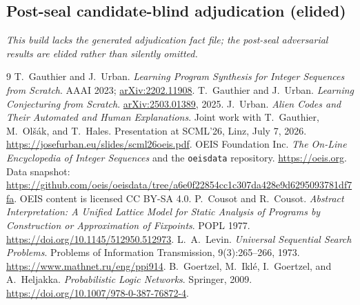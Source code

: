 \documentclass[11pt]{article}
\newcommand{\code}[1]{\texttt{#1}}
\begin{document}
\subsection{Post-seal candidate-blind adjudication (elided)}
\emph{This build lacks the generated adjudication fact file; the post-seal
adversarial results are elided rather than silently omitted.}
\fi

\begin{thebibliography}{9}
 T.~Gauthier and J.~Urban.
  \emph{Learning Program Synthesis for Integer Sequences from Scratch}.
  AAAI 2023; \href{https://arxiv.org/abs/2202.11908}{arXiv:2202.11908}.
 T.~Gauthier and J.~Urban.
  \emph{Learning Conjecturing from Scratch}.
  \href{https://arxiv.org/abs/2503.01389}{arXiv:2503.01389}, 2025.
 J.~Urban.
  \emph{Alien Codes and Their Automated and Human Explanations}.
  Joint work with T.~Gauthier, M.~Ol\v{s}\'ak, and T.~Hales. Presentation at SCML'26,
  Linz, July 7, 2026.
  \url{https://josefurban.eu/slides/scml26oeis.pdf}.
 OEIS Foundation Inc.
  \emph{The On-Line Encyclopedia of Integer Sequences} and the \code{oeisdata}
  repository. \url{https://oeis.org}. Data snapshot:
  \url{https://github.com/oeis/oeisdata/tree/a6e0f22854cc1c307da428e9d6295093781df7fa}.
  OEIS content is licensed CC BY-SA 4.0.
 P.~Cousot and R.~Cousot.
  \emph{Abstract Interpretation: A Unified Lattice Model for Static Analysis of Programs by
  Construction or Approximation of Fixpoints}. POPL 1977.
  \url{https://doi.org/10.1145/512950.512973}.
 L.~A.~Levin.
  \emph{Universal Sequential Search Problems}. Problems of Information Transmission,
  9(3):265--266, 1973. \url{https://www.mathnet.ru/eng/ppi914}.
 B.~Goertzel, M.~Ikl\'e, I.~Goertzel, and A.~Heljakka.
  \emph{Probabilistic Logic Networks}. Springer, 2009.
  \url{https://doi.org/10.1007/978-0-387-76872-4}.
\end{thebibliography}
\end{document}

